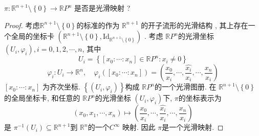 \documentclass[../main.tex]{subfiles}
\begin{document}
\begin{exercise}{}{}
     \(   \pi:\mathbb{R} ^{n+ 1}\setminus \left\{ 0 \right\}\to \mathbb{R} P^{n}  \) 是否是光滑映射 ?
\end{exercise}
\begin{proof}
    考虑\(  \mathbb{R} ^{n+ 1}\setminus \left\{ 0 \right\}  \)的标准的作为 \(  \mathbb{R} ^{n+ 1}  \) 的开子流形的光滑结构 , 其上存在一个全局的坐标卡 \(  \left( \mathbb{R} ^{n+ 1}\setminus \left\{ 0 \right\},\mathrm{Id}_{\mathbb{R}^{n+ 1}\setminus \left\{ 0 \right\}} \right)   \) . 考虑 \(  \mathbb{R} P^{n}  \)的光滑坐标 \(  \left( U_{i}, \varphi _{i} \right) ,i= 0,1,2 ,\cdots ,n\), 其中  \[
    U_{i}= \left\{ \left[ x_0:\cdots : x_{n} \right]\in \mathbb{R} P^{n}:x_{i}\neq 0  \right\}
    \] \[
     \varphi _i :U_i\to \mathbb{R} ^{n}, \quad  \varphi _i \left( \left[ x_0:\cdots :x_{n} \right]  \right)= \left( \frac{x_{0} }{x_{i} },\cdots ,\frac{\hat{x_{i}} }{ x_{i}} ,\cdots , \frac{x_{n} }{x_{i} }   \right) 
    \] \(  \left[ x_0:\cdots :x_{n} \right]   \) 为齐次坐标. \(  \left\{ \left( U_{i}, \varphi _{i} \right)  \right\}  \)构成 \(  \mathbb{R} P^{n}  \)的一个光滑图册.   在 \(  \mathbb{R} ^{n+ 1}\setminus \left\{ 0 \right\}  \)的全局坐标卡, 和任意的 \(  \mathbb{R} P^{n}  \)的光滑坐标 \(  \left( U_{i}, \varphi _{i} \right)   \)下, \(  \pi  \)的坐标表示为 \[
    \left( x_0,x_1,\cdots ,x_{n} \right)\mapsto \left( \frac{x_0 }{x_{i} },\cdots ,\frac{\hat{x_{i}} }{x_{i} },\cdots , \frac{x_{n} }{x_{i} }    \right)  
    \]    是 \(  \pi ^{-1} \left( U_{i} \right) \subseteq \mathbb{R} ^{n+ 1} \)到 \(  \mathbb{R} ^{n}  \)的一个\(  C^{\infty}  \) 映射. 因此 \(   \pi  \)是一个光滑映射.    
\end{proof}
\end{document}
